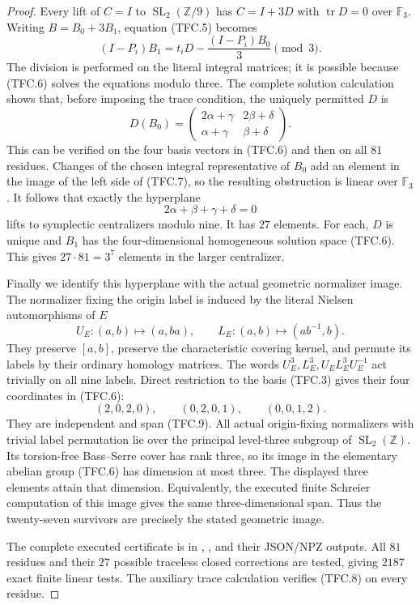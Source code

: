 \begin{proof}
Every lift of $C=I$ to $\operatorname{SL}_2(\mathbb Z/9)$ has
$C=I+3D$ with $\operatorname{tr}D=0$ over $\mathbb F_3$.
Writing $B=B_0+3B_1$, equation (TFC.5) becomes
\[
 (I-P_i)B_1=t_iD-\frac{(I-P_i)B_0}{3}\pmod3.             \tag{TFC.7}
\]
The division is performed on the literal integral matrices; it is
possible because (TFC.6) solves the equations modulo three.
The complete solution calculation shows that, before imposing the
trace condition, the uniquely permitted $D$ is
\[
 D(B_0)=\begin{pmatrix}
 2\alpha+\gamma&2\beta+\delta\\
 \alpha+\gamma&\beta+\delta
 \end{pmatrix}.                                        \tag{TFC.8}
\]
This can be verified on the four basis vectors in (TFC.6) and then
on all $81$ residues.  Changes of the chosen integral representative
of $B_0$ add an element in the image of the left side of (TFC.7),
so the resulting obstruction is linear over $\mathbb F_3$.
It follows that exactly the hyperplane
\[
 2\alpha+\beta+\gamma+\delta=0                          \tag{TFC.9}
\]
lifts to symplectic centralizers modulo nine.  It has $27$ elements.
For each, $D$ is unique and $B_1$ has the four-dimensional
homogeneous solution space (TFC.6).  This gives $27\cdot81=3^7$
elements in the larger centralizer.

Finally we identify this hyperplane with the actual geometric
normalizer image.  The normalizer fixing the origin label is
induced by the literal Nielsen automorphisms of $E$
\[
 U_E:(a,b)\mapsto(a,ba),\qquad
 L_E:(a,b)\mapsto(ab^{-1},b).
\]
They preserve $[a,b]$, preserve the characteristic covering kernel,
and permute its labels by their ordinary homology matrices.
The words $U_E^3,L_E^3,U_EL_E^3U_E^{-1}$ act trivially on all nine
labels.  Direct restriction to the basis (TFC.3) gives their four
coordinates in (TFC.6):
\[
 (2,0,2,0),\qquad(0,2,0,1),\qquad(0,0,1,2).
\]
They are independent and span (TFC.9).  All actual origin-fixing
normalizers with trivial label permutation lie over the principal
level-three subgroup of $\operatorname{SL}_2(\mathbb Z)$.
Its torsion-free Bass--Serre cover has rank three, so its image in
the elementary abelian group (TFC.6) has dimension at most three.
The displayed three elements attain that dimension.  Equivalently,
the executed finite Schreier computation of this image gives the
same three-dimensional span.  Thus the twenty-seven survivors are
precisely the stated geometric image.

The complete executed certificate is in
,
, and their JSON/NPZ
outputs.  All $81$ residues and their $27$ possible traceless closed
corrections are tested, giving $2187$ exact finite linear tests.
The auxiliary trace calculation verifies (TFC.8) on every residue.
\end{proof}

